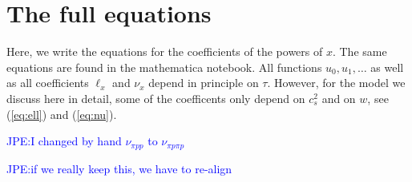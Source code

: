 \documentclass[12pt,a4paper]{article}
\def\eref#1{(\ref{#1})}
\numberwithin{equation}{section}
\theoremstyle{definition} %
\def\JP#1{\textcolor{blue}{JPE:#1}}
\begin{document}
\section{The full equations}\label{sec:full}
\def\mytau{}

Here, we write the equations for the coefficients of the powers of
$x$. The same equations are found in the mathematica notebook.
All functions $u_0, u_1, \dots$ as well as all coefficients $\ell_{x}$
and $\nu_x$ depend in principle on $\tau$. However, for the model we
discuss here in detail, some of the coefficents only depend on $c_s^2$
and on $w$, see \eref{eq:ell} and \eref{eq:nu}.


\JP{I changed by hand $\nu_{\pi pp} $ to $\nu_{\pi p\pi p}$}

\JP{if we really keep this, we have to re-align}
\end{document}
